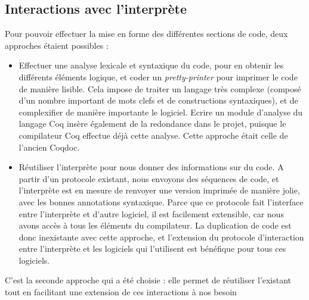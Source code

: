 \documentclass[a4paper, 11pt]{report}
\begin{document}
    \subsection{Interactions avec l'interprète}
    Pour pouvoir effectuer la mise en forme des différentes sections de code,
    deux approches étaient possibles :
      \begin{itemize}
        \item Effectuer une analyse lexicale et syntaxique du code, pour
          en obtenir les différents éléments logique, et coder un
          \textit{pretty-printer} pour imprimer le code de manière lisible.
          Cela impose de traiter un langage très complexe (composé d'un nombre
          important de mots clefs et de constructions syntaxiques), et de
          complexifier de manière importante le logiciel. Ecrire un module
          d'analyse du langage Coq insère également de la redondance dans le
          projet, puisque le compilateur Coq effectue déjà cette analyse. Cette
          approche était celle de l'ancien Coqdoc.
        \item Réutiliser l'interprète pour nous donner des informations sur
          du code. A partir d'un protocole existant, nous envoyons des séquences
          de code, et l'interprète est en mesure de renvoyer une version imprimée
          de manière jolie, avec les bonnes annotations syntaxique.
          Parce que ce protocole fait l'interface entre l'interprète et d'autre
          logiciel, il est facilement extensible, car nous avons accès à tous
          les éléments du compilateur. La duplication de code est donc inexistante
          avec cette approche, et l'extension du protocole d'interaction entre
          l'interprète et les logiciels qui l'utilisent est bénéfique pour tous
          ces logiciels.
      \end{itemize}
    C'est la seconde approche qui a été choisie : elle permet de réutiliser
    l'existant tout en facilitant une extension de ces interactions à nos besoin
\end{document}
